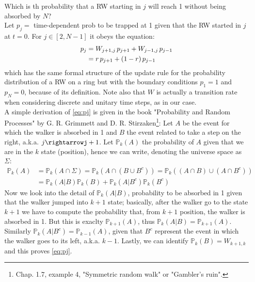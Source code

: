 \documentclass[4apaper,11pt,fleqn]{article}
\theoremstyle{remark}
\theoremstyle{definition}
\begin{document}
Which is th probability that a RW starting in $j$ will reach 1 without being absorbed by $N$?\\
Let $p_j =$ time-dependent prob to be trapped at 1 given that the RW started in $j$ at $t=0$. For $j \in [2,N-1]$ it obeys the equation:
\begin{align}
  \label{eq:pj}
  p_{j} &=W_{j+1, j} \, p_{j+1} + W_{j-1, j}\, p_{j-1} \\ \notag
  &=r\, p_{j+1}  + (1-r)\, p_{j-1}
\end{align}
which has the same formal structure of the update rule for the probability distribution of a RW on a ring but with the boundary conditions $p_1 = 1$ and $p_N = 0$, because of its definition.
Note also that $W$ is actually a transition rate when considering discrete and unitary time steps, as in our case.\\
A simple derivation of \eqref{eq:pj} is given in the book "Probability and Random Processes" by G. R. Grimmett and D. R. Stirzaken\footnote{Chap. 1.7, example 4, "Symmetric random walk" or "Gambler's ruin".}: Let $A$ be the event for which the walker is absorbed in 1 and $B$ the event related to take a step on the right, a.k.a. $j\rightarrowj+1$. Let $\mathbb{P}_k(A)$ the probability of $A$ given that we are in the $k$ state (position), hence we can write, denoting the universe space as $\Sigma$:
\begin{align*}
  \mathbb{P}_{k}(A) &= \mathbb{P}_k (A \cap \Sigma) = \mathbb{P}_k (A \cap (B \cup B^c) ) = \mathbb{P}_k ( (A\cap B ) \cup ( A \cap B^c ) ) \\
                    &= \mathbb{P}_{k}(A | B) \mathbb{P}_k (B)+\mathbb{P}_{k}\left(A | B^{c}\right) \mathbb{P}_k \left(B^{c}\right)
\end{align*}
Now we look into the detail of $\mathbb{P}_{k}(A | B)$, probability to be absorbed in 1 given that the walker jumped into $k+1$ state; basically, after the walker go to the state $k+1$ we have to compute the probability that, from $k+1$ position, the walker is absorbed in 1. But this is exaclty $\mathbb{P}_{k+1} (A)$, thus $\mathbb{P}_{k}(A | B) = \mathbb{P}_{k+1} (A)$. Similarly $\mathbb{P}_{k}(A | B^c) = \mathbb{P}_{k-1} (A)$, given that $B^c$ represent the event in which the walker goes to its left, a.k.a. $k-1$.
Lastly, we can identify $\mathbb{P}_k (B) = W_{k+1,k}$ and this proves \eqref{eq:pj}.


\end{document}

